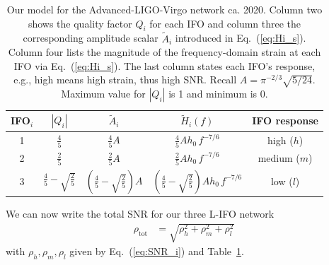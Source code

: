 \documentclass[prd,amsmath,amssymb,aps,floats,amsfonts,notitlepage,superscriptaddress,eqsecnum,nofootinbib,10pt]{revtex4-1}
\newcommand{\nn}{\nonumber}
\newcommand{\f}{\frac}
\newcommand\T{\rule{0pt}{2.6ex}}       %
\newcommand\B{\rule[-1.2ex]{0pt}{0pt}} %
\begin{document}
\begin{table}[h]
\centering
\begin{tabular}{c|c|c|c|c}
 IFO$_i$  %
 & $|Q_i|$ & $\tilde{A}_i$ & $\tilde{H}_i(f)$ & IFO response \\
 \hline
 1 &  $\tfrac{4}{5} $&  $\tfrac{4}{5}A$ & $\tfrac{4}{5}A h_0\, f^{-7/6}$ & high ($h$) \T\\
 2 &  $\tfrac{2}{5} $ & $\tfrac{2}{5}A$ & $ \tfrac{2}{5}A h_0 \, f^{-7/6}$ & medium ($m$)\B\T \\
 3 &  $\tfrac{4}{5}-\sqrt{\tfrac{2}{5}} $ & $\left(\tfrac{4}{5}-\sqrt{\tfrac{2}{5}}\right)A$ & $ \left(\tfrac{4}{5}-\sqrt{\tfrac{2}{5}}\right)A h_0 \, f^{-7/6}$& low ($l$) \B \\
 \hline
\end{tabular}
\caption{%
Our model for the Advanced-LIGO-Virgo network ca. 2020. %
Column two shows the quality factor $Q_i$ for each IFO and column three the corresponding amplitude scalar $\tilde{A}_i$ introduced
in Eq.~(\ref{eq:Hi_s}).
Column four lists the magnitude of the frequency-domain strain at each IFO via Eq.~(\ref{eq:Hi_s}).
The last column states each IFO's response, e.g., high means high strain, thus high SNR.
Recall $A= \pi^{-2/3} \sqrt{5/24}$. Maximum value for $|Q_i|$ is 1 and minimum is 0.
}\label{table:network_params}
\end{table}
%
%
We can now write the total SNR for our three L-IFO network
%
\begin{align}
\rho_\text{tot} &= \sqrt{\rho^2_h+\rho^2_m+\rho^2_l} \label{eq:SNR_total_3IFOs} 
\end{align}
%
with $\rho_h, \rho_m,\rho_l$ given by Eq.~(\ref{eq:SNR_i}) and Table~\ref{table:network_params}.
\end{document}
